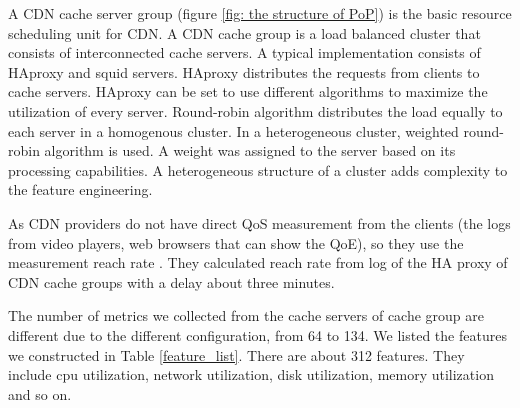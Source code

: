 \documentclass[5p]{elsarticle}
\newcommand{\dabiaolv}{reach rate }
\begin{document}
A CDN cache server group (figure \ref{fig: the structure of PoP}) is the basic resource scheduling unit for CDN. A CDN cache group is a load balanced cluster that consists of interconnected cache servers. A typical implementation consists of HAproxy and squid servers. HAproxy distributes the requests from clients to cache servers. HAproxy can be set to use different algorithms to maximize the utilization of every server. Round-robin algorithm distributes the load equally to each server in a homogenous cluster. In a heterogeneous cluster, weighted round-robin algorithm is used. A weight was assigned to the server based on its processing capabilities. A heterogeneous structure of a cluster adds complexity to the feature engineering.

As CDN providers do not have direct QoS measurement from the clients (the logs from video players, web browsers that can show the QoE), so they use the measurement \dabiaolv. They calculated \dabiaolv from log of the HA proxy of CDN cache groups with a delay about three minutes.  

The number of metrics we collected from the cache servers of cache group are different due to the different configuration, from 64 to 134. We listed the features we constructed in Table \ref{feature_list}. There are about 312 features. They include cpu utilization, network utilization, disk utilization, memory utilization and so on.
\end{document}
